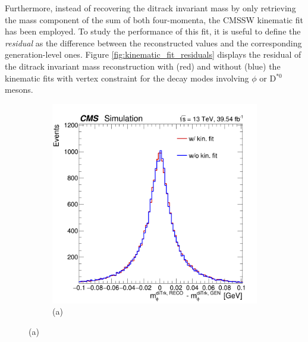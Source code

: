Furthermore, instead of recovering the ditrack invariant mass by only retrieving the mass component of the sum of both four-momenta, the CMSSW \cite{CMSSW} kinematic fit has been employed. To study the performance of this fit, it is useful to define the \textit{residual} as the difference between the reconstructed values and the corresponding generation-level ones. Figure \ref{fig:kinematic_fit_residuals} displays the residual of the ditrack invariant mass reconstruction with (red) and without (blue) the kinematic fits with vertex constraint for the decay modes involving $ \phi$ or D$^{*0}$ mesons.
\begin{figure}[!ht]
    \captionsetup[subfigure]{labelformat=empty}
    \vspace*{-0.2cm}
    \centering
    \setlength{\mylength}{\textwidth}
    \begin{subfigure}[t]{0.50\mylength}
            \centering
            \includegraphics[width=0.49\mylength]{resources/plots/Phi3_kinematic_fit_residual.png}
            \vspace*{-0.2cm}
            \caption{\footnotesize (a)}
    \end{subfigure}%

\end{figure}
